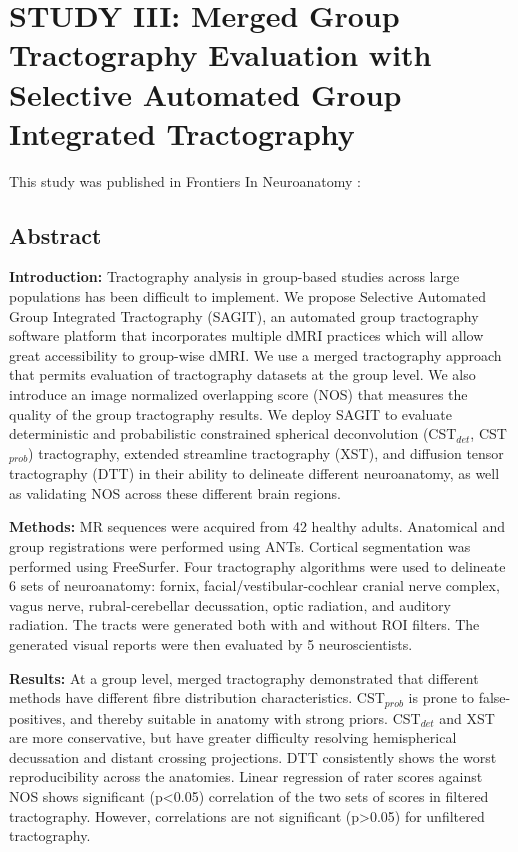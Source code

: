 \graphicspath{{images/sagit/}}

\chapter{STUDY III: Merged Group Tractography Evaluation with Selective Automated Group Integrated Tractography}
\label{section:study3}

This study was published in Frontiers In Neuroanatomy :


\section{Abstract }
\textbf{Introduction:} Tractography analysis in group-based studies across large populations has been difficult to implement. We propose Selective Automated Group Integrated Tractography (SAGIT), an automated group tractography software platform that incorporates multiple dMRI practices which will allow great accessibility to group-wise dMRI. We use a merged tractography approach that permits evaluation of tractography datasets at the group level.  We also introduce an image normalized overlapping score (NOS) that measures the quality of the group tractography results. We deploy SAGIT to evaluate deterministic and probabilistic constrained spherical deconvolution (CST$_{det}$, CST$_{prob}$) tractography, extended streamline tractography (XST), and diffusion tensor tractography (DTT) in their ability to delineate different neuroanatomy, as well as validating NOS across these different brain regions. 

\textbf{Methods:} MR sequences were acquired from 42 healthy adults. Anatomical and group registrations were performed using ANTs. Cortical segmentation was performed using FreeSurfer. Four tractography algorithms were used to delineate 6 sets of neuroanatomy: fornix, facial/vestibular-cochlear cranial nerve complex, vagus nerve, rubral-cerebellar decussation, optic radiation, and auditory radiation. The tracts were generated both with and without ROI filters. The generated visual reports were then evaluated by 5 neuroscientists. 

\textbf{Results:} At a group level, merged tractography demonstrated that different methods have different fibre distribution characteristics. CST$_{prob}$ is prone to false-positives, and thereby suitable in anatomy with strong priors. CST$_{det}$ and XST are more conservative, but have greater difficulty resolving hemispherical decussation and distant crossing projections. DTT consistently shows the worst reproducibility across the anatomies. Linear regression of rater scores against NOS shows significant (p\textless0.05) correlation of the two sets of scores in filtered tractography. However, correlations are not significant (p\textgreater0.05) for unfiltered tractography.

